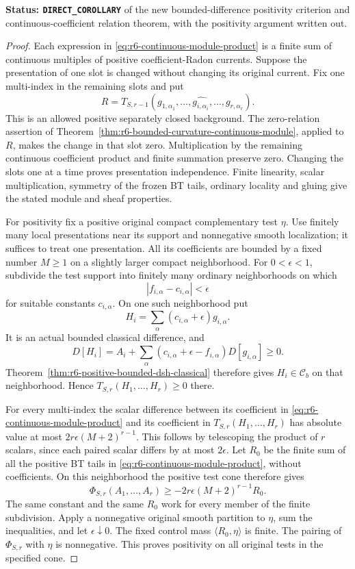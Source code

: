 \noindent\textbf{Status: \texttt{DIRECT\_COROLLARY}} of the new
bounded-difference positivity criterion and continuous-coefficient
relation theorem, with the positivity argument written out.

\begin{proof}
Each expression in \eqref{eq:r6-continuous-module-product} is a finite
sum of continuous multiples of positive coefficient-Radon currents.
Suppose the presentation of one slot is changed without changing its
original current. Fix one multi-index in the remaining slots and put
\[
 R=T_{S,r-1}(g_{1,\alpha_1},\ldots,
              \widehat{g_{i,\alpha_i}},\ldots,g_{r,\alpha_r}).
\]
This is an allowed positive separately closed background. The
zero-relation assertion of
Theorem~\ref{thm:r6-bounded-curvature-continuous-module}, applied to
$R$, makes the change in that slot zero. Multiplication by the
remaining continuous coefficient product and finite summation
preserve zero. Changing the slots one at a time proves presentation
independence. Finite linearity, scalar multiplication, symmetry of
the frozen BT tails, ordinary locality and gluing give the stated
module and sheaf properties.

For positivity fix a positive original compact complementary test
$\eta$. Use finitely many local presentations near its support and
nonnegative smooth localization; it suffices to treat one presentation.
All its coefficients are bounded by a fixed number $M\ge1$ on a
slightly larger compact neighborhood. For $0<\epsilon<1$, subdivide
the test support into finitely many ordinary neighborhoods on which
\[
                    |f_{i,\alpha}-c_{i,\alpha}|<\epsilon
\]
for suitable constants $c_{i,\alpha}$. On one such neighborhood put
\[
 H_i=\sum_\alpha(c_{i,\alpha}+\epsilon)g_{i,\alpha}.
\]
It is an actual bounded classical difference, and
\[
 D[H_i]=A_i+\sum_\alpha(c_{i,\alpha}+\epsilon-f_{i,\alpha})
                                      D[g_{i,\alpha}]\ge0.
\]
Theorem~\ref{thm:r6-positive-bounded-dsh-classical} therefore gives
$H_i\in\mathcal C_b$ on that neighborhood. Hence
$T_{S,r}(H_1,\ldots,H_r)\ge0$ there.

For every multi-index the scalar difference between its coefficient
in \eqref{eq:r6-continuous-module-product} and its coefficient in
$T_{S,r}(H_1,\ldots,H_r)$ has absolute value at most
$2r\epsilon(M+2)^{r-1}$. This follows by telescoping the product of
$r$ scalars, since each paired scalar differs by at most $2\epsilon$.
Let $R_0$ be the finite sum of all the positive BT tails in
\eqref{eq:r6-continuous-module-product}, without coefficients.
On this neighborhood the positive test cone therefore gives
\[
          \Phi_{S,r}(A_1,\ldots,A_r)
                   \ge -2r\epsilon(M+2)^{r-1}R_0.
\]
The same constant and the same $R_0$ work for every member of the
finite subdivision. Apply a nonnegative original smooth partition
to $\eta$, sum the inequalities, and let $\epsilon\downarrow0$.
The fixed control mass $\langle R_0,\eta\rangle$ is finite. The
pairing of $\Phi_{S,r}$ with $\eta$ is nonnegative. This proves
positivity on all original tests in the specified cone.


\end{proof}
